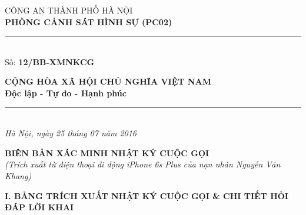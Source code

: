 \documentclass[12pt,a4paper]{article}
\begin{document}
\noindent
\begin{minipage}[t]{0.46\textwidth}
    \begin{center}
        \fontsize{11pt}{13pt}\selectfont
        CÔNG AN THÀNH PHỐ HÀ NỘI\\
        \textbf{PHÒNG CẢNH SÁT HÌNH SỰ (PC02)}\\[-0.2em]
        \rule{3.2cm}{0.6pt}\\[0.25cm]
        \fontsize{11pt}{13pt}\selectfont Số: \textbf{12/BB-XMNKCG}
    \end{center}
\end{minipage}
\hfill
\begin{minipage}[t]{0.52\textwidth}
    \begin{center}
        \fontsize{11pt}{13pt}\selectfont
        \textbf{CỘNG HÒA XÃ HỘI CHỦ NGHĨA VIỆT NAM}\\
        \textbf{Độc lập - Tự do - Hạnh phúc}\\[-0.2em]
        \rule{3.6cm}{0.6pt}\\[0.25cm]
        \textit{Hà Nội, ngày 25 tháng 07 năm 2016}
    \end{center}
\end{minipage}

\vspace{0.5cm}

\begin{center}
    \textbf{\Large BIÊN BẢN XÁC MINH NHẬT KÝ CUỘC GỌI}\\[0.15cm]
    \textit{(Trích xuất từ điện thoại di động iPhone 6s Plus của nạn nhân Nguyễn Văn Khang)}
\end{center}

\vspace{0.3cm}



\vspace{0.3cm}\noindent\textbf{\large I. BẢNG TRÍCH XUẤT NHẬT KÝ CUỘC GỌI \& CHI TIẾT HỎI ĐÁP LỜI KHAI}\\[0.15cm]
\end{document}
